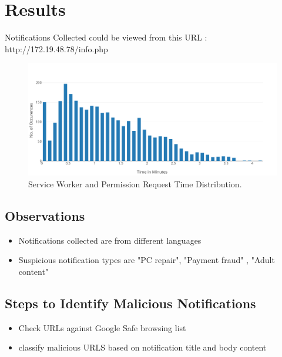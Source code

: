 \section{Results}

Notifications Collected  could be viewed from this URL : http://172.19.48.78/info.php


\begin{figure}[h]
\includegraphics[width=\columnwidth]{figs/sw_reg_distribution.pdf}
\caption{Service Worker and Permission Request Time Distribution. }
\label{sw_reg_time}
\end{figure}

\subsection{Observations}
\begin{itemize}
    \item Notifications collected are from different languages
    \item Suspicious notification types are "PC repair", "Payment fraud" , "Adult content"
\end{itemize}

\subsection{Steps to Identify Malicious Notifications}
\begin{itemize}
    \item Check URLs against Google Safe browsing list
    \item classify malicious URLS based on notification title and body content
\end{itemize}

